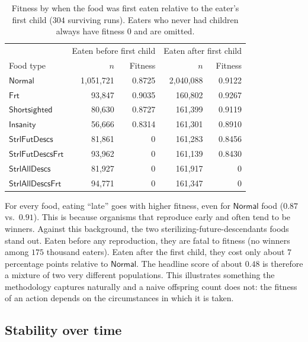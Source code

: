 \documentclass{article}
\begin{document}
\begin{table}[ht]
    \centering
    \caption{Fitness by when the food was first eaten relative to the eater's
    first child ($304$ surviving runs). Eaters who never had children always
    have fitness $0$ and are omitted.}
    \label{tab:timing}
    \begin{tabular}{lrrrr}
        \hline
        & \multicolumn{2}{c}{Eaten before first child}
        & \multicolumn{2}{c}{Eaten after first child} \\
        Food type & $n$ & Fitness & $n$ & Fitness \\
        \hline
        $\mathsf{Normal}$ & 1,051,721 & 0.8725 & 2,040,088 & 0.9122 \\
        $\mathsf{Frt}$ & 93,847 & 0.9035 & 160,802 & 0.9267 \\
        $\mathsf{Shortsighted}$ & 80,630 & 0.8727 & 161,399 & 0.9119 \\
        $\mathsf{Insanity}$ & 56,666 & 0.8314 & 161,301 & 0.8910 \\
        $\mathsf{StrlFutDescs}$ & 81,861 & 0 & 161,283 & 0.8456 \\
        $\mathsf{StrlFutDescsFrt}$ & 93,962 & 0 & 161,139 & 0.8430 \\
        $\mathsf{StrlAllDescs}$ & 81,927 & 0 & 161,917 & 0 \\
        $\mathsf{StrlAllDescsFrt}$ & 94,771 & 0 & 161,347 & 0 \\
        \hline
    \end{tabular}
\end{table}

For every food, eating ``late'' goes with higher fitness, even for
$\mathsf{Normal}$ food ($0.87$ vs.\ $0.91$). This is because organisms that
reproduce early and often tend to be winners. Against this background, the
two sterilizing-future-descendants foods stand out. Eaten before any
reproduction, they are fatal to fitness (no winners among $175$ thousand
eaters). Eaten after the first child, they cost only about $7$ percentage
points relative to $\mathsf{Normal}$. The headline score of about $0.48$ is
therefore a mixture of two very different populations. This illustrates
something the methodology captures naturally and a naive offspring count
does not: the fitness of an action depends on the circumstances in which it is
taken.


\subsection{Stability over time}
\label{sec:time-blocks}
\end{document}
